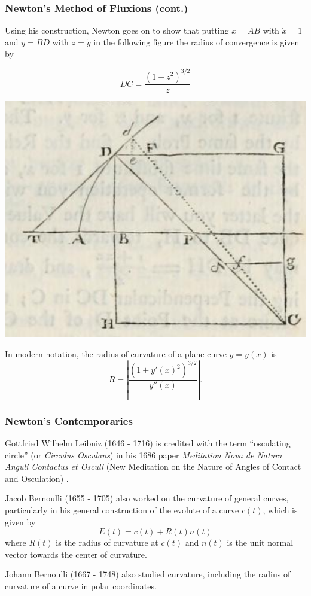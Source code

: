 \documentclass[handout]{beamer}
\newcommand{\abs}[1]{\left|#1\right|}
\theoremstyle{definition}
\begin{document}
\begin{frame}
    \frametitle{Newton's Method of Fluxions (cont.)}

    \pause
    Using his construction, Newton goes on to show that putting $x = AB$ with
    $\dot{x} = 1$ and $y = BD$ with $z = \dot{y}$ in the following figure \cite{newton}
    the radius of convergence is given by
    \begin{minipage}{.49\textwidth}
        \[
            DC = \dfrac{(1+z^2)^{3/2}}{\dot{z}}
        \]
    \end{minipage}
    \begin{minipage}{.49\textwidth}
        \centering
        \includegraphics[width=.8\textwidth]{images/newton-formula-derivation.png}
    \end{minipage}
    \pause
    In modern notation, the radius of curvature of a plane curve $y = y(x)$ is
    \[
        R = \abs{\frac{(1+y'(x)^2)^{3/2}}{y''(x)}}.
    \]
\end{frame}

\begin{frame}
    \frametitle{Newton's Contemporaries}

    \pause
    Gottfried Wilhelm Leibniz (1646 - 1716) is credited with the term ``osculating circle''
    (or \emph{Circulus Osculans}) in his 1686 paper \textit{Meditation Nova de Natura Anguli
    Contactus et Osculi} (New Meditation on the Nature of Angles of Contact and Osculation)
    \cite{unsat-hist,geom-diff-view}.

    \pause
    Jacob Bernoulli (1655 - 1705) also worked on the curvature of general
    curves, particularly in his general construction of the evolute of a curve $c(t)$,
    which is given by
    \[
        E(t) = c(t) + R(t)n(t)
    \]
    where $R(t)$ is the radius of curvature at $c(t)$ and $n(t)$ is the unit normal
    vector towards the center of curvature.

    \pause
    Johann Bernoulli (1667 - 1748) also studied curvature, including the radius of curvature
    of a curve in polar coordinates.

\end{frame}
\end{document}
